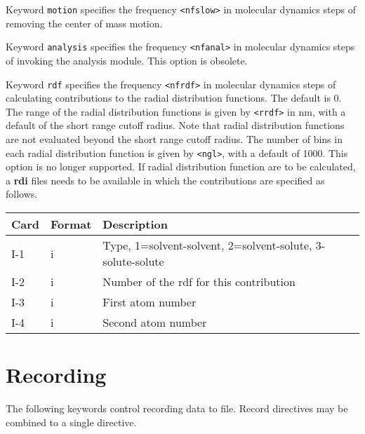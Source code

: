 \begin{description}
Keyword \verb+motion+
specifies the frequency \verb+<nfslow>+ in molecular dynamics steps of
removing the center of mass motion.

Keyword \verb+analysis+
specifies the frequency \verb+<nfanal>+ in molecular dynamics steps of
invoking the analysis module. This option is obsolete.

Keyword \verb+rdf+
specifies the frequency \verb+<nfrdf>+ in molecular dynamics steps of
calculating contributions to the radial distribution functions.
The default is 0. The range of the radial distribution
functions is given by \verb+<rrdf>+ in nm, with a default of the short
range cutoff radius. Note that radial distribution functions are not
evaluated beyond the short range cutoff radius. The number of
bins in each radial distribution function is given by \verb+<ngl>+, with
a default of 1000. This option is no longer supported.
If radial distribution function are to be
calculated, a {\bf rdi} files needs to be available in which the
contributions are specified as follows.
\begin{center}
\begin{tabular}{lll}
\hline\hline
Card & Format & Description \\ \hline
I-1  & i & Type, 1=solvent-solvent, 2=solvent-solute,
3-solute-solute\\
I-2  & i & Number of the rdf for this contribution\\
I-3  & i & First atom number \\
I-4  & i & Second atom number \\ 
\hline
\end{tabular}
\end{center}
\end{description}

\section{Recording}
The following keywords control recording data to file.
Record directives may be combined to a single directive.

